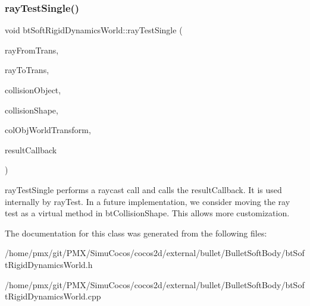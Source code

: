 \subsubsection{\texorpdfstring{ray\+Test\+Single()}{rayTestSingle()}}
{\footnotesize\ttfamily void bt\+Soft\+Rigid\+Dynamics\+World\+::ray\+Test\+Single (\begin{DoxyParamCaption}\item[{const bt\+Transform \&}]{ray\+From\+Trans,  }\item[{const bt\+Transform \&}]{ray\+To\+Trans,  }\item[{bt\+Collision\+Object $\ast$}]{collision\+Object,  }\item[{const bt\+Collision\+Shape $\ast$}]{collision\+Shape,  }\item[{const bt\+Transform \&}]{col\+Obj\+World\+Transform,  }\item[{Ray\+Result\+Callback \&}]{result\+Callback }\end{DoxyParamCaption})\hspace{0.3cm}{\ttfamily [static]}}

ray\+Test\+Single performs a raycast call and calls the result\+Callback. It is used internally by ray\+Test. In a future implementation, we consider moving the ray test as a virtual method in bt\+Collision\+Shape. This allows more customization. 

The documentation for this class was generated from the following files\+:\begin{DoxyCompactItemize}
\item 
/home/pmx/git/\+P\+M\+X/\+Simu\+Cocos/cocos2d/external/bullet/\+Bullet\+Soft\+Body/bt\+Soft\+Rigid\+Dynamics\+World.\+h\item 
/home/pmx/git/\+P\+M\+X/\+Simu\+Cocos/cocos2d/external/bullet/\+Bullet\+Soft\+Body/bt\+Soft\+Rigid\+Dynamics\+World.\+cpp\end{DoxyCompactItemize}
